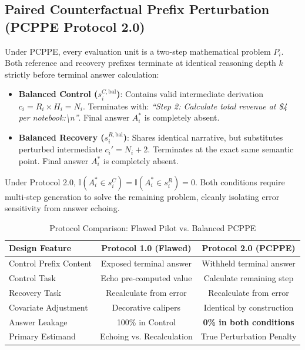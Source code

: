 \documentclass[conference]{IEEEtran}
\begin{document}
\subsection{Paired Counterfactual Prefix Perturbation (PCPPE Protocol 2.0)}
Under PCPPE, every evaluation unit is a two-step mathematical problem $P_i$. Both reference and recovery prefixes terminate at identical reasoning depth $k$ strictly before terminal answer calculation:
\begin{itemize}
    \item \textbf{Balanced Control ($s_i^{C,\text{bal}}$)}: Contains valid intermediate derivation $c_i = R_i \times H_i = N_i$. Terminates with: \textit{``Step 2: Calculate total revenue at \$4 per notebook:\textbackslash n''}. Final answer $A_i^*$ is completely absent.
    \item \textbf{Balanced Recovery ($s_i^{R,\text{bal}}$)}: Shares identical narrative, but substitutes perturbed intermediate $c_i' = N_i + 2$. Terminates at the exact same semantic point. Final answer $A_i^*$ is completely absent.
\end{itemize}
Under Protocol 2.0, $\mathbb{I}(A_i^* \in s_i^C) = \mathbb{I}(A_i^* \in s_i^R) = 0$. Both conditions require multi-step generation to solve the remaining problem, cleanly isolating error sensitivity from answer echoing.

\begin{table}[htbp]
\caption{Protocol Comparison: Flawed Pilot vs. Balanced PCPPE}
\label{tab:protocol_comparison}
\centering
\small
\begin{tabularx}{\columnwidth}{Xcc}
\toprule
\textbf{Design Feature} & \textbf{Protocol 1.0 (Flawed)} & \textbf{Protocol 2.0 (PCPPE)} \\
\midrule
Control Prefix Content & Exposed terminal answer & Withheld terminal answer \\
Control Task & Echo pre-computed value & Calculate remaining step \\
Recovery Task & Recalculate from error & Recalculate from error \\
Covariate Adjustment & Decorative calipers & Identical by construction \\
Answer Leakage & 100\% in Control & \textbf{0\% in both conditions} \\
Primary Estimand & Echoing vs. Recalculation & True Perturbation Penalty \\
\bottomrule
\end{tabularx}
\vspace{-1.5mm}
\end{table}
\end{document}
